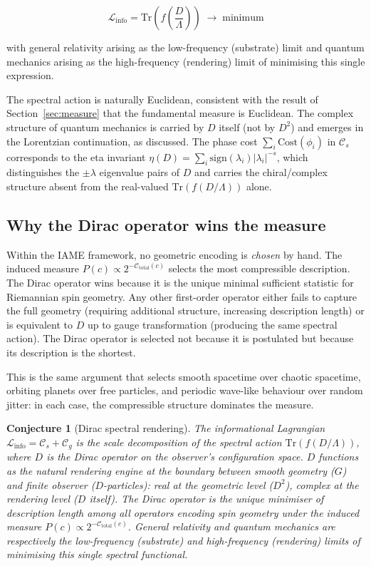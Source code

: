 \documentclass[12pt,a4paper]{article}
\newcommand{\iame}{\textsc{IAME}}
\newcommand{\Linfo}{\mathcal{L}_{\mathrm{info}}}
\newcommand{\Cs}{\mathcal{C}_s}
\newcommand{\Cg}{\mathcal{C}_g}
\newcommand{\Ctotal}{\mathcal{C}_{\mathrm{total}}}
\newtheorem{conjecture}{Conjecture}
\begin{document}
\begin{equation}
\label{eq:unified}
\Linfo = \mathrm{Tr}\!\left(f\!\left(\frac{D}{\Lambda}\right)\right)
\;\longrightarrow\; \text{minimum}
\end{equation}

with general relativity arising as the low-frequency (substrate) limit and
quantum mechanics arising as the high-frequency (rendering) limit of minimising
this single expression.

The spectral action is naturally Euclidean, consistent with the result of
Section~\ref{sec:measure} that the fundamental measure is Euclidean. The
complex structure of quantum mechanics is carried by $D$ itself (not by $D^2$)
and emerges in the Lorentzian continuation, as discussed. The phase cost
$\sum_i \mathrm{Cost}(\phi_i)$ in $\Cs$ corresponds to the eta invariant
$\eta(D) = \sum_i \mathrm{sign}(\lambda_i)|\lambda_i|^{-s}$, which
distinguishes the $\pm\lambda$ eigenvalue pairs of $D$ and carries the
chiral/complex structure absent from the real-valued $\mathrm{Tr}(f(D/\Lambda))$
alone.

\subsection*{Why the Dirac operator wins the measure}

Within the \iame{} framework, no geometric encoding is \emph{chosen} by hand.
The induced measure $P(c) \propto 2^{-\Ctotal(c)}$ selects the most compressible
description. The Dirac operator wins because it is the unique minimal sufficient
statistic for Riemannian spin geometry. Any other first-order operator either
fails to capture the full geometry (requiring additional structure, increasing
description length) or is equivalent to $D$ up to gauge transformation
(producing the same spectral action). The Dirac operator is selected not
because it is postulated but because its description is the shortest.

This is the same argument that selects smooth spacetime over chaotic spacetime,
orbiting planets over free particles, and periodic wave-like behaviour over
random jitter: in each case, the compressible structure dominates the measure.

\begin{conjecture}[Dirac spectral rendering]
\label{conj:dirac}
The informational Lagrangian $\Linfo = \Cs + \Cg$ is the scale decomposition
of the spectral action $\mathrm{Tr}(f(D/\Lambda))$, where $D$ is the Dirac
operator on the observer's configuration space. $D$ functions as the natural
rendering engine at the boundary between smooth geometry ($G$) and finite
observer ($D$-particles): real at the geometric level ($D^2$), complex at the
rendering level ($D$ itself). The Dirac operator is the unique minimiser of
description length among all operators encoding spin geometry under the induced
measure $P(c) \propto 2^{-\Ctotal(c)}$. General relativity and quantum
mechanics are respectively the low-frequency (substrate) and high-frequency
(rendering) limits of minimising this single spectral functional.
\end{conjecture}
\end{document}
